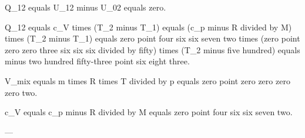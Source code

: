 Q_12 equals U_12 minus U_02 equals zero.  

Q_12 equals c_V times (T_2 minus T_1) equals (c_p minus R divided by M) times (T_2 minus T_1) equals zero point four six six seven two times (zero point zero zero three six six six divided by fifty) times (T_2 minus five hundred) equals minus two hundred fifty-three point six eight three.  

V_mix equals m times R times T divided by p equals zero point zero zero zero zero two.  

c_V equals c_p minus R divided by M equals zero point four six six seven two.  

---